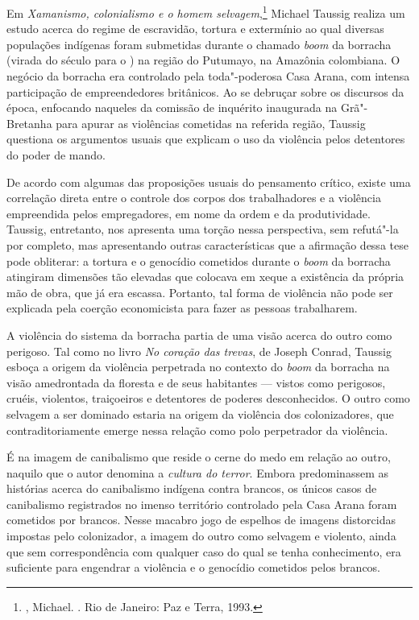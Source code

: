 Em \emph{Xamanismo, colonialismo e o homem selvagem},\footnote{, Michael. {}. Rio de Janeiro: Paz e Terra, 1993.} Michael Taussig
realiza um estudo acerca do regime de escravidão, tortura e extermínio
ao qual diversas populações indígenas foram submetidas durante o chamado
\emph{boom} da borracha (virada do século  para o ) na região do
Putumayo, na Amazônia
colombiana. O negócio da borracha era controlado pela toda"-poderosa Casa Arana, com intensa participação de empreendedores britânicos. Ao se
debruçar sobre os discursos da época, enfocando naqueles da comissão de
inquérito inaugurada na Grã"-Bretanha para apurar as violências cometidas
na referida região, Taussig questiona os argumentos usuais que explicam
o uso da violência pelos detentores do poder de mando.


De acordo com algumas das proposições usuais do pensamento crítico,
existe uma correlação direta entre o controle dos corpos dos
trabalhadores e a violência empreendida pelos empregadores, em nome da
ordem e da produtividade. Taussig, entretanto, nos apresenta uma torção
nessa perspectiva, sem refutá"-la por completo, mas
apresentando outras características que a afirmação dessa tese pode obliterar:
a tortura e o genocídio cometidos durante o \emph{boom} da borracha
atingiram dimensões tão elevadas que colocava em xeque a existência da
própria mão de obra, que já era escassa. Portanto, tal forma de violência não pode ser explicada pela coerção economicista para fazer as pessoas trabalharem.

A violência do sistema da borracha partia de uma visão acerca do outro como perigoso. Tal como no livro \emph{No coração das trevas}, de Joseph Conrad, Taussig esboça a
origem da violência perpetrada no contexto do \emph{boom} da borracha na
visão amedrontada da floresta e de seus habitantes --- vistos como
perigosos, cruéis, violentos, traiçoeiros e detentores de poderes
desconhecidos. O outro como selvagem a ser dominado estaria na origem da
violência dos colonizadores, que contraditoriamente emerge nessa relação
como polo perpetrador da violência.

É na imagem de canibalismo que reside o cerne do medo em relação ao
outro, naquilo que o autor denomina a \emph{cultura do terror}. Embora
predominassem as histórias acerca do canibalismo indígena contra
brancos, os únicos casos de canibalismo registrados no imenso território
controlado pela Casa Arana foram cometidos por brancos. Nesse macabro
jogo de espelhos de imagens distorcidas impostas pelo colonizador, a
imagem do outro como selvagem e violento, ainda que sem correspondência
com qualquer caso do qual se tenha conhecimento, era suficiente para
engendrar a violência e o genocídio cometidos pelos brancos.

